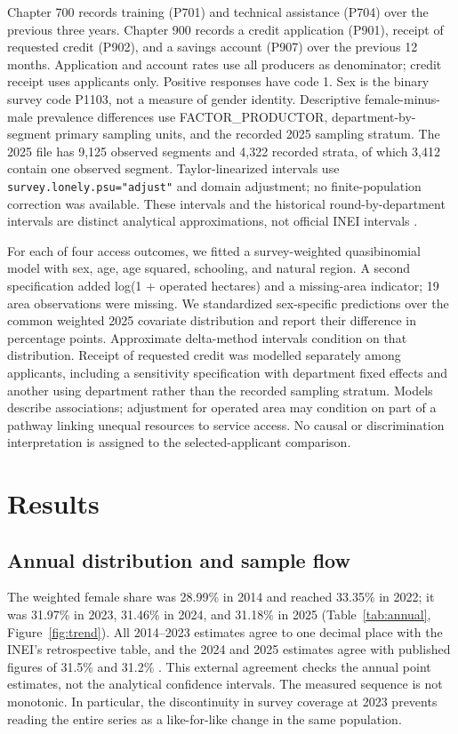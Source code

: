 \documentclass[11pt,a4paper]{article}
\begin{document}
Chapter 700 records training (P701) and technical assistance (P704) over the previous three years. Chapter 900 records a credit application (P901), receipt of requested credit (P902), and a savings account (P907) over the previous 12 months. Application and account rates use all producers as denominator; credit receipt uses applicants only. Positive responses have code 1. Sex is the binary survey code P1103, not a measure of gender identity. Descriptive female-minus-male prevalence differences use FACTOR\_PRODUCTOR, department-by-segment primary sampling units, and the recorded 2025 sampling stratum. The 2025 file has 9,125 observed segments and 4,322 recorded strata, of which 3,412 contain one observed segment. Taylor-linearized intervals use \texttt{survey.lonely.psu="adjust"} and domain adjustment; no finite-population correction was available. These intervals and the historical round-by-department intervals are distinct analytical approximations, not official INEI intervals \cite{lumley2004,surveydocs}.

For each of four access outcomes, we fitted a survey-weighted quasibinomial model with sex, age, age squared, schooling, and natural region. A second specification added log(1 + operated hectares) and a missing-area indicator; 19 area observations were missing. We standardized sex-specific predictions over the common weighted 2025 covariate distribution and report their difference in percentage points. Approximate delta-method intervals condition on that distribution. Receipt of requested credit was modelled separately among applicants, including a sensitivity specification with department fixed effects and another using department rather than the recorded sampling stratum. Models describe associations; adjustment for operated area may condition on part of a pathway linking unequal resources to service access. No causal or discrimination interpretation is assigned to the selected-applicant comparison.

\section{Results}
\subsection{Annual distribution and sample flow}
The weighted female share was 28.99\% in 2014 and reached 33.35\% in 2022; it was 31.97\% in 2023, 31.46\% in 2024, and 31.18\% in 2025 (Table~\ref{tab:annual}, Figure~\ref{fig:trend}). All 2014--2023 estimates agree to one decimal place with the INEI's retrospective table, and the 2024 and 2025 estimates agree with published figures of 31.5\% and 31.2\% \cite{inei2023results,ineigender2025,inei2025results}. This external agreement checks the annual point estimates, not the analytical confidence intervals. The measured sequence is not monotonic. In particular, the discontinuity in survey coverage at 2023 prevents reading the entire series as a like-for-like change in the same population.
\end{document}
